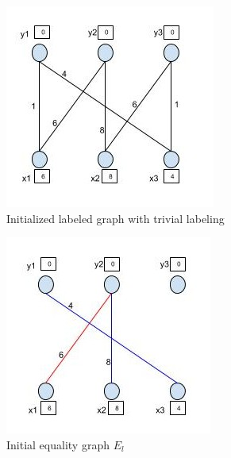 \documentclass[twoside]{article}
\begin{document}
\begin{figure}[h]
  \centering
  \begin{subfigure}{.45\textwidth}
  	\begin{framed}
    	\centering
    	\includegraphics[width=.8\linewidth]{figure3.jpg}
  	\end{framed}
    \caption{Initialized labeled graph with trivial labeling}
    \label{fig:example_init}
  \end{subfigure}
  \begin{subfigure}{.1\textwidth}

  \end{subfigure}
  \begin{subfigure}{.45\textwidth}
  	\begin{framed}
    	\centering
    	\includegraphics[width=.8\linewidth]{figure4.jpg}
  	\end{framed}
    \caption{Initial equality graph $E_{l}$\\ }
    \label{fig:example_eq_graph}
  \end{subfigure}
  \caption{}
  \label{fig:alg_example1}
\end{figure}
\end{document}
